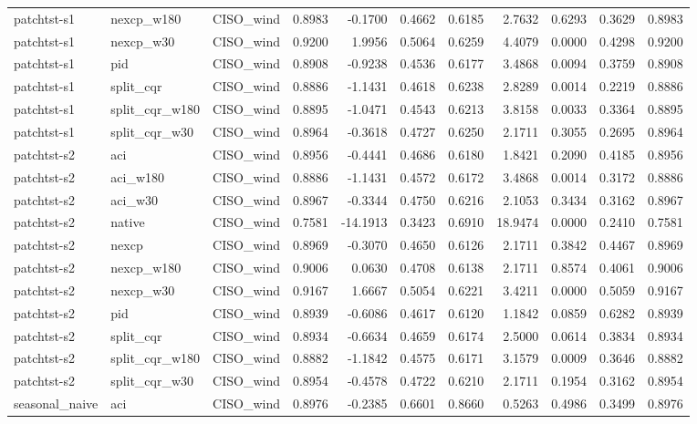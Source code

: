 \begin{tabular}{lllrrrrrrrr}
patchtst-s1 & nexcp_w180 & CISO_wind & 0.8983 & -0.1700 & 0.4662 & 0.6185 & 2.7632 & 0.6293 & 0.3629 & 0.8983 \\
patchtst-s1 & nexcp_w30 & CISO_wind & 0.9200 & 1.9956 & 0.5064 & 0.6259 & 4.4079 & 0.0000 & 0.4298 & 0.9200 \\
patchtst-s1 & pid & CISO_wind & 0.8908 & -0.9238 & 0.4536 & 0.6177 & 3.4868 & 0.0094 & 0.3759 & 0.8908 \\
patchtst-s1 & split_cqr & CISO_wind & 0.8886 & -1.1431 & 0.4618 & 0.6238 & 2.8289 & 0.0014 & 0.2219 & 0.8886 \\
patchtst-s1 & split_cqr_w180 & CISO_wind & 0.8895 & -1.0471 & 0.4543 & 0.6213 & 3.8158 & 0.0033 & 0.3364 & 0.8895 \\
patchtst-s1 & split_cqr_w30 & CISO_wind & 0.8964 & -0.3618 & 0.4727 & 0.6250 & 2.1711 & 0.3055 & 0.2695 & 0.8964 \\
patchtst-s2 & aci & CISO_wind & 0.8956 & -0.4441 & 0.4686 & 0.6180 & 1.8421 & 0.2090 & 0.4185 & 0.8956 \\
patchtst-s2 & aci_w180 & CISO_wind & 0.8886 & -1.1431 & 0.4572 & 0.6172 & 3.4868 & 0.0014 & 0.3172 & 0.8886 \\
patchtst-s2 & aci_w30 & CISO_wind & 0.8967 & -0.3344 & 0.4750 & 0.6216 & 2.1053 & 0.3434 & 0.3162 & 0.8967 \\
patchtst-s2 & native & CISO_wind & 0.7581 & -14.1913 & 0.3423 & 0.6910 & 18.9474 & 0.0000 & 0.2410 & 0.7581 \\
patchtst-s2 & nexcp & CISO_wind & 0.8969 & -0.3070 & 0.4650 & 0.6126 & 2.1711 & 0.3842 & 0.4467 & 0.8969 \\
patchtst-s2 & nexcp_w180 & CISO_wind & 0.9006 & 0.0630 & 0.4708 & 0.6138 & 2.1711 & 0.8574 & 0.4061 & 0.9006 \\
patchtst-s2 & nexcp_w30 & CISO_wind & 0.9167 & 1.6667 & 0.5054 & 0.6221 & 3.4211 & 0.0000 & 0.5059 & 0.9167 \\
patchtst-s2 & pid & CISO_wind & 0.8939 & -0.6086 & 0.4617 & 0.6120 & 1.1842 & 0.0859 & 0.6282 & 0.8939 \\
patchtst-s2 & split_cqr & CISO_wind & 0.8934 & -0.6634 & 0.4659 & 0.6174 & 2.5000 & 0.0614 & 0.3834 & 0.8934 \\
patchtst-s2 & split_cqr_w180 & CISO_wind & 0.8882 & -1.1842 & 0.4575 & 0.6171 & 3.1579 & 0.0009 & 0.3646 & 0.8882 \\
patchtst-s2 & split_cqr_w30 & CISO_wind & 0.8954 & -0.4578 & 0.4722 & 0.6210 & 2.1711 & 0.1954 & 0.3162 & 0.8954 \\
seasonal_naive & aci & CISO_wind & 0.8976 & -0.2385 & 0.6601 & 0.8660 & 0.5263 & 0.4986 & 0.3499 & 0.8976 \\

\end{tabular}
